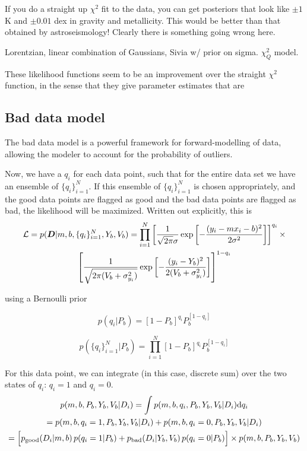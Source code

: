 \documentclass[preprint]{aastex} %
\newcommand{\qN}{\{q_i\}_{i=1}^N}
\begin{document}
If you do a straight up $\chi^2$ fit to the data, you can get posteriors that look like $\pm 1$ K and $\pm 0.01$ dex in gravity and metallicity. This would be better than that obtained by astroseismology! Clearly there is something going wrong here.

Lorentzian, linear combination of Gaussians, Sivia w/ prior on sigma. $\chi^2_Q$ model.

These likelihood functions seem to be an improvement over the straight $\chi^2$ function, in the sense that they give parameter estimates that are 

\subsection{Bad data model}
The bad data model \citep{pre97,dbl10} is a powerful framework for forward-modelling of data, allowing the modeler to account for the probability of outliers.

Now, we have a $q_i$ for each data point, such that for the entire data set we have an ensemble of $\qN$. If this ensemble of $\qN$ is chosen appropriately, and the good data points are flagged as good and the bad data points are flagged as bad, the likelihood will be maximized. Written out explicitly, this is
\begin{multline}
  {\cal L} = p({\bm D} | m,b,\qN,Y_b,V_b) = \prod_{i=1}^N \left [ \frac{1}{\sqrt{2 \pi} \sigma} \exp \left[ - \frac{(y_i - m x_i - b)^2}{2 \sigma^2} \right] \right ]^{q_i}  \times \\
  \left [ \frac{1}{\sqrt{2 \pi (V_b + \sigma_{y_i}^2)}} \exp \left[ - \frac{(y_i - Y_b)^2}{2 (V_b + \sigma_{y_i}^2)} \right]
  \right ]^{1 - q_i}
\end{multline}

using a Bernoulli prior

\begin{equation}
  p(q_i | P_b) = [1-P_b]^{q_i} P_b^{[1-q_i]}
\end{equation}

\begin{equation}
  p(\qN | P_b) = \prod_{i=1}^N [1-P_b]^{q_i} P_b^{[1-q_i]}
\end{equation}

For this data point, we can integrate (in this case, discrete sum) over the two states of $q_i$: $q_i = 1$ and $q_i = 0$. 
\begin{multline}
  p(m, b, P_b, Y_b, V_b | D_i)  =  \int p( m, b, q_i, P_b, Y_b, V_b| D_i) {\rm d} q_i \\
  = p(m, b, q_i=1, P_b, Y_b, V_b | D_i) + p(m, b, q_i=0, P_b, Y_b, V_b | D_i) \\
  = \Bigl[ p_{\rm good}(D_i | m,b)\, p(q_i=1 | P_b) +  p_{\rm bad}(D_i | Y_b, V_b)\, p(q_i=0 | P_b)\Bigr] \times p(m,b,P_b, Y_b,V_b) 
\end{multline}
\end{document}
